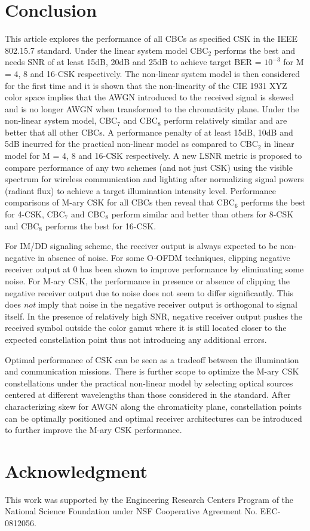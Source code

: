 \documentclass[10pt,letterpaper]{article}
\begin{document}
\section{Conclusion}\label{sCONC}

This article explores the performance of all CBCs as specified CSK in the IEEE 802.15.7 standard. Under the linear system model CBC$_{2}$
performs the best and needs SNR of at least 15dB, 20dB and 25dB to
achieve target BER = $10^{-3}$ for M = 4, 8 and 16-CSK respectively. The
non-linear system model is then considered for the first time and it is shown that the
non-linearity of the CIE 1931 XYZ color space implies that the AWGN
introduced to the received signal is skewed and is no longer AWGN
when transformed to the chromaticity plane. Under the non-linear
system model, CBC$_{7}$ and CBC$_{8}$ perform relatively similar and are better that all other CBCs. A performance penalty
of at least 15dB, 10dB and 5dB incurred for the practical non-linear model as compared to CBC$_{2}$ in linear model for
M = 4, 8 and 16-CSK respectively. A new LSNR metric is proposed
to compare performance of any two schemes (and not just CSK) using the visible
spectrum for wireless communication and lighting after normalizing signal powers (radiant flux) to achieve a target illumination intensity level. Performance comparisons of M-ary CSK for all CBCs then reveal that CBC$_{6}$ performs the best for
4-CSK, CBC$_{7}$ and CBC$_{8}$ perform similar and better than others for 8-CSK and CBC$_{8}$ performs the best for 16-CSK. 

{\color{red}For IM/DD signaling scheme, the receiver output is always expected to be non-negative in absence of noise. For some O-OFDM techniques, clipping negative receiver output at 0 has been shown to improve performance by eliminating some noise. For M-ary CSK, the performance in presence or absence of clipping the negative receiver output due to noise does not seem to differ significantly. This does \textit{not} imply that noise in the negative receiver output is orthogonal to signal itself. In the presence of relatively high SNR, negative receiver output pushes the received symbol outside the color gamut where it is still located closer to the expected constellation point thus not introducing any additional errors.}

Optimal performance of CSK can be seen as a tradeoff between the
illumination and communication missions. There is further scope to
optimize the M-ary CSK constellations under the practical non-linear
model by selecting optical sources centered at different wavelengths
than those considered in the standard. After characterizing skew for
AWGN along the chromaticity plane, constellation points can be
optimally positioned and optimal receiver architectures can be introduced to further improve the M-ary CSK performance.

\section*{Acknowledgment}
This work was supported by the Engineering Research Centers Program of the National Science Foundation under NSF Cooperative Agreement No. EEC-0812056.
\end{document}
